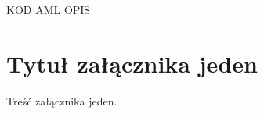 \documentclass	{xmgr}
\begin{document}
KOD AML
OPIS

\appendix
\chapter{Tytuł załącznika jeden}

Treść załącznika jeden.




\listoftables

\listoffigures

\oswiadczenie
\end{document}
